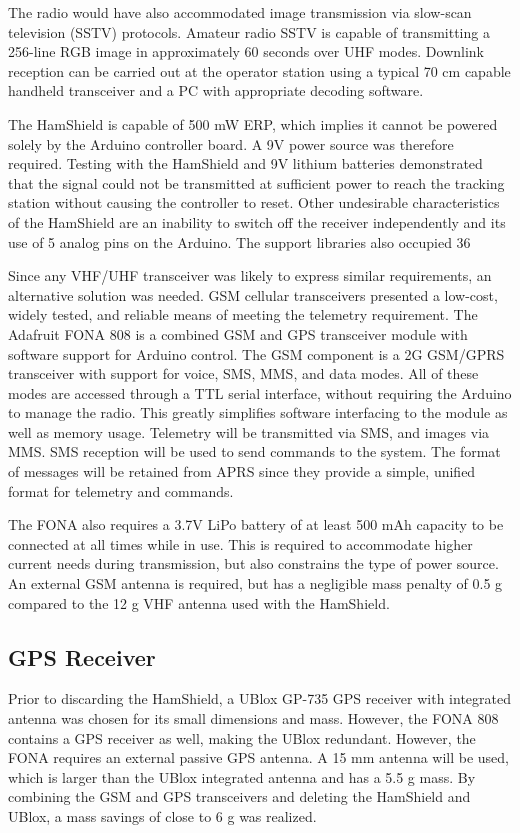 \documentclass[conference,compsoc]{IEEEtran}
\begin{document}
The radio would have also accommodated image transmission via slow-scan television (SSTV) protocols.  Amateur radio SSTV is capable of transmitting a 256-line RGB image in approximately 60 seconds over UHF modes.  Downlink reception can be carried out at the operator station using a typical 70 cm capable handheld transceiver and a PC with appropriate decoding software. 

The HamShield is capable of 500 mW ERP, which implies it cannot be powered solely by the Arduino controller board.  A 9V power source was therefore required.  Testing with the HamShield and 9V lithium batteries demonstrated that the signal could not be transmitted at sufficient power to reach the tracking station without causing the controller to reset.  Other undesirable characteristics of the HamShield are an inability to switch off the receiver independently and its use of 5 analog pins on the Arduino.  The support libraries also occupied 36%

Since any VHF/UHF transceiver was likely to express similar requirements, an alternative solution was needed. GSM cellular transceivers presented a low-cost, widely tested, and reliable means of meeting the telemetry requirement. The Adafruit FONA 808 is a combined GSM and GPS transceiver module with software support for Arduino control.  The GSM component is a 2G GSM/GPRS transceiver with support for voice, SMS, MMS, and data modes.  All of these modes are accessed through a TTL serial interface, without requiring the Arduino to manage the radio.  This greatly simplifies software interfacing to the module as well as memory usage.  Telemetry will be transmitted via SMS, and images via MMS.  SMS reception will be used to send commands to the system.  The format of messages will be retained from APRS since they provide a simple, unified format for telemetry and commands.

The FONA also requires a 3.7V LiPo battery of at least 500 mAh capacity to be connected at all times while in use.  This is required to accommodate higher current needs during transmission, but also constrains the type of power source.  An external GSM antenna is required, but has a negligible mass penalty of 0.5 g compared to the 12 g VHF antenna used with the HamShield.

\subsection{GPS Receiver}
Prior to discarding the HamShield, a UBlox GP-735 GPS receiver with integrated antenna was chosen for its small dimensions and mass.  However, the FONA 808 contains a GPS receiver as well, making the UBlox redundant.  However, the FONA requires an external passive GPS antenna.  A 15 mm antenna will be used, which is larger than the UBlox integrated antenna and has a 5.5 g mass.  By combining the GSM and GPS transceivers and deleting the HamShield and UBlox, a mass savings of close to 6 g was realized. 
\end{document}
